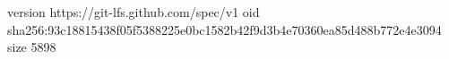 version https://git-lfs.github.com/spec/v1
oid sha256:93c18815438f05f5388225e0bc1582b42f9d3b4e70360ea85d488b772e4e3094
size 5898
